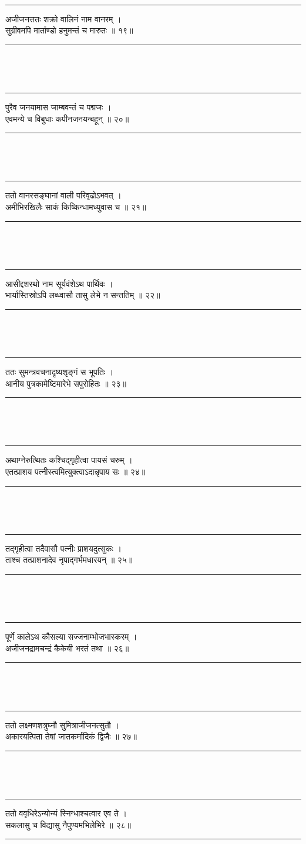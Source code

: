 \documentclass[a4paper,10pt]{report}
\newenvironment{moola}
{
~\\
\hrule
\begin{center}
\begin{LARGE}
}
{
\end{LARGE}
\end{center}
\hrule
~\\
}
\begin{document}
\begin{moola}
अजीजनत्ततः शक्रो वालिनं नाम वानरम् ।\\
सुग्रीवमपि मार्ताण्डो हनुमन्तं च मारुतः ॥ १९॥
\end{moola}

\begin{moola}
पुरैव जनयामास जाम्बवन्तं च पद्मजः ।\\
एवमन्ये च विबुधाः कपीनजनयन्बहून् ॥ २०॥
\end{moola}

\begin{moola}
ततो वानरसङ्घानां वाली परिवृढोऽभवत् ।\\
अमीभिरखिलैः साकं किष्किन्धामध्युवास च ॥ २१॥
\end{moola}

\begin{moola}
आसीद्दशरथो नाम सूर्यवंशेऽथ पार्थिवः ।\\
भार्यास्तिस्रोऽपि लब्ध्वासौ तासु लेभे न सन्ततिम् ॥ २२॥
\end{moola}

\begin{moola}
ततः सुमन्त्रवचनादृष्यश‍ृङ्गं स भूपतिः ।\\
आनीय पुत्रकामेष्टिमारेभे सपुरोहितः ॥ २३॥
\end{moola}

\begin{moola}
अथाग्नेरुत्थितः कश्चिद्गृहीत्वा पायसं चरुम् ।\\
एतत्प्राशय पत्नीस्त्वमित्युक्त्वाऽदान्नृपाय सः ॥ २४॥
\end{moola}

\begin{moola}
तद्‍गृहीत्वा तदैवासौ पत्नीः प्राशयदुत्सुकः ।\\
ताश्च तत्प्राशनादेव नृपाद्गर्भमधारयन् ॥ २५॥
\end{moola}

\begin{moola}
पूर्णे कालेऽथ कौसल्या सज्जनाम्भोजभास्करम् ।\\
अजीजनद्रामचन्द्रं कैकेयी भरतं तथा ॥ २६॥
\end{moola}

\begin{moola}
ततो लक्ष्मणशत्रुघ्नौ सुमित्राजीजनत्सुतौ ।\\
अकारयत्पिता तेषां जातकर्मादिकं द्विजैः ॥ २७॥
\end{moola}

\begin{moola}
ततो ववृधिरेऽन्योन्यं स्निग्धाश्चत्वार एव ते ।\\
सकलासु च विद्यासु नैपुण्यमभिलेभिरे ॥ २८॥
\end{moola}
\end{document}
